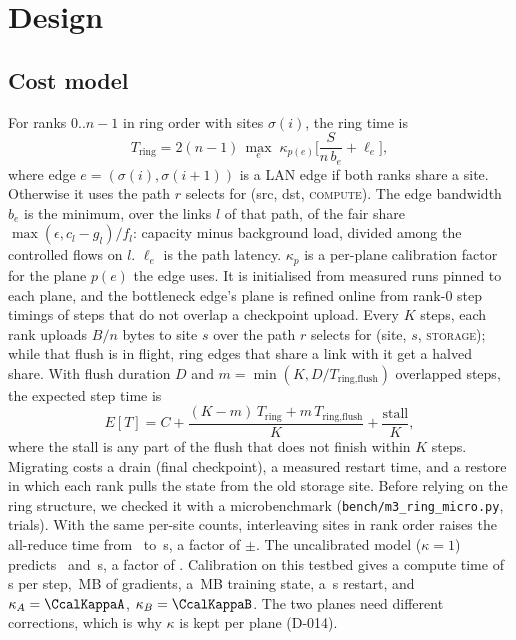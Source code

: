 \section{Design}
\label{sec:design}

\subsection{Cost model}
For ranks $0..n{-}1$ in ring order with sites $\sigma(i)$, the ring time is
\[
T_{\text{ring}} = 2(n-1)\,\max_{e}\;\kappa_{p(e)}\Big[\frac{S}{n\,b_e} + \ell_e\Big],
\]
where edge $e=(\sigma(i),\sigma(i{+}1))$ is a LAN edge if both ranks share a site. Otherwise it uses the
path $r$ selects for (src, dst, \textsc{compute}). The edge bandwidth $b_e$ is the minimum, over the
links $l$ of that path, of the fair share $\max(\epsilon, c_l - g_l)/f_l$: capacity minus background
load, divided among the controlled flows on $l$. $\ell_e$ is the path latency. $\kappa_{p}$ is a per-plane
calibration factor for the plane $p(e)$ the edge uses. It is initialised from measured runs pinned to each
plane, and the bottleneck edge's plane is refined online from rank-0 step timings of steps that do not
overlap a checkpoint upload. Every $K$
steps, each rank uploads $B/n$ bytes to site $s$ over the path $r$ selects for (site, $s$,
\textsc{storage}); while that flush is in flight, ring edges that share a link with it get a halved share.
With flush duration $D$ and $m=\min(K, D/T_{\text{ring,flush}})$ overlapped steps, the expected step time is
\[
E[T] = C + \frac{(K-m)\,T_{\text{ring}} + m\,T_{\text{ring,flush}}}{K} + \frac{\text{stall}}{K},
\]
where the stall is any part of the flush that does not finish within $K$ steps. Migrating costs a drain
(final checkpoint), a measured restart time, and a restore in which each rank pulls the state from the
old storage site. Before relying on the ring structure, we checked it with a microbenchmark
(\texttt{bench/m3\_ring\_micro.py}, \CringTrials{} trials). With the same per-site counts, interleaving
sites in rank order raises the all-reduce time from \CringContig\ to \CringInter\,s, a factor of
\CringRatio{}$\pm$\CringRatioCi. The uncalibrated model ($\kappa=1$) predicts \CringPredContig\ and
\CringPredInter\,s, a factor of \CringPredRatio. Calibration on this testbed gives a compute time of
\CcalComputeS\,s per step, \CcalGradMB\,MB of gradients, a \CcalCkptMB\,MB training state, a
\CcalRestartS\,s restart, and $\kappa_A=\CcalKappaA$, $\kappa_B=\CcalKappaB$. The two planes need
different corrections, which is why $\kappa$ is kept per plane (D-014).

